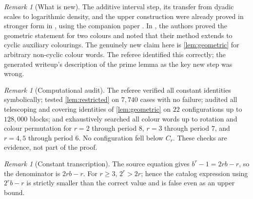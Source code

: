 \documentclass[11pt,a4paper]{article}
\theoremstyle{plain}
\theoremstyle{definition}
\theoremstyle{remark}
\newtheorem{remark}[theorem]{Remark}
\begin{document}
\begin{remark}[What is new]
The additive interval step, its transfer from dyadic scales to logarithmic
density, and the upper construction were already proved in stronger form
in \cite{CFP22}, using the companion paper \cite{CFPcomp}. In
\cite[Lemma~7]{CFP22}, the authors proved the geometric statement for two
colours and noted that their method extends to cyclic auxiliary
colourings. The genuinely new claim here is \cref{lem:geometric} for
arbitrary non-cyclic colour words. The referee identified this correctly;
the generated writeup's description of the prime lemma as the key new
step was wrong.
\end{remark}

\begin{remark}[Computational audit]
The referee verified all constant identities symbolically; tested
\cref{lem:restricted} on $7{,}740$ cases with no failure; audited all
telescoping and covering identities of \cref{lem:geometric} on
$22$ configurations up to $128{,}000$ blocks; and exhaustively searched
all colour words up to rotation and colour permutation for $r=2$ through
period $8$, $r=3$ through period $7$, and $r=4,5$ through period $6$.
No configuration fell below $C_r$. These checks are evidence, not part of
the proof.
\end{remark}

\begin{remark}[Constant transcription]\label{rem:constant}
The source equation gives $b^r-1=2rb-r$, so the denominator is
$2rb-r$. For $r\ge3$, $2^r>2r$; hence the catalog expression using
$2^rb-r$ is strictly smaller than the correct value and is false even
as an upper bound.
\end{remark}
\end{document}
